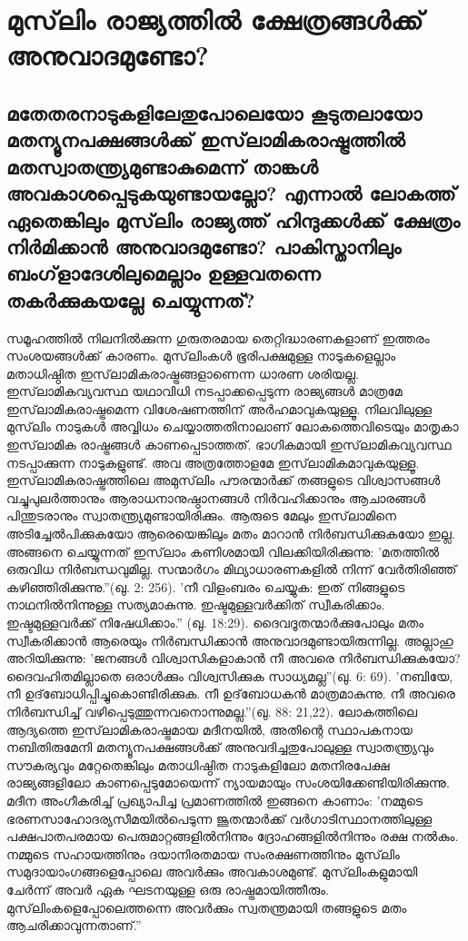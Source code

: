 \chapter{മുസ്‌ലിം രാജ്യത്തില്‍ ക്ഷേത്രങ്ങള്‍ക്ക് അനുവാദമുണ്ടോ? }
\section{ മതേതരനാടുകളിലേതുപോലെയോ കൂടുതലായോ മതന്യൂനപക്ഷങ്ങള്‍ക്ക് ഇസ്‌ലാമികരാഷ്ട്രത്തില്‍ മതസ്വാതന്ത്യ്രമുണ്ടാകുമെന്ന് താങ്കള്‍ അവകാശപ്പെടുകയുണ്ടായല്ലോ? എന്നാല്‍ ലോകത്ത് ഏതെങ്കിലും മുസ്‌ലിം രാജ്യത്ത് ഹിന്ദുക്കള്‍ക്ക് ക്ഷേത്രം നിര്‍മിക്കാന്‍ അനുവാദമുണ്ടോ? പാകിസ്താനിലും ബംഗ്‌ളാദേശിലുമെല്ലാം ഉള്ളവതന്നെ തകര്‍ക്കുകയല്ലേ ചെയ്യുന്നത്?}

 സമൂഹത്തില്‍ നിലനില്‍ക്കുന്ന ഗുരുതരമായ തെറ്റിദ്ധാരണകളാണ് ഇത്തരം സംശയങ്ങള്‍ക്ക് കാരണം. മുസ്‌ലിംകള്‍ ഭൂരിപക്ഷമുള്ള നാടുകളെല്ലാം മതാധിഷ്ഠിത ഇസ്‌ലാമികരാഷ്ട്രങ്ങളാണെന്ന ധാരണ ശരിയല്ല. ഇസ്‌ലാമികവ്യവസ്ഥ യഥാവിധി നടപ്പാക്കപ്പെടുന്ന രാജ്യങ്ങള്‍ മാത്രമേ ഇസ്‌ലാമികരാഷ്ട്രമെന്ന വിശേഷണത്തിന് അര്‍ഹമാവുകയുള്ളൂ. നിലവിലുള്ള മുസ്‌ലിം നാടുകള്‍ അവ്വിധം ചെയ്യാത്തതിനാലാണ് ലോകത്തെവിടെയും മാതൃകാ ഇസ്‌ലാമിക രാഷ്ട്രങ്ങള്‍ കാണപ്പെടാത്തത്. ഭാഗികമായി ഇസ്‌ലാമികവ്യവസ്ഥ നടപ്പാക്കുന്ന നാടുകളുണ്ട്. അവ അത്രത്തോളമേ ഇസ്‌ലാമികമാവുകയുള്ളൂ.
ഇസ്‌ലാമികരാഷ്ട്രത്തിലെ അമുസ്‌ലിം പൗരന്മാര്‍ക്ക് തങ്ങളുടെ വിശ്വാസങ്ങള്‍ വച്ചുപുലര്‍ത്താനും ആരാധനാനുഷ്ഠാനങ്ങള്‍ നിര്‍വഹിക്കാനും ആചാരങ്ങള്‍ പിന്തുടരാനും സ്വാതന്ത്യ്രമുണ്ടായിരിക്കും. ആരുടെ മേലും ഇസ്‌ലാമിനെ അടിച്ചേല്‍പിക്കുകയോ ആരെയെങ്കിലും മതം മാറാന്‍ നിര്‍ബന്ധിക്കുകയോ ഇല്ല. അങ്ങനെ ചെയ്യുന്നത് ഇസ്‌ലാം കണിശമായി വിലക്കിയിരിക്കുന്നു: 'മതത്തില്‍ ഒരുവിധ നിര്‍ബന്ധവുമില്ല. സന്മാര്‍ഗം മിഥ്യാധാരണകളില്‍ നിന്ന് വേര്‍തിരിഞ്ഞ് കഴിഞ്ഞിരിക്കുന്നു.''(ഖു. 2: 256).
'നീ വിളംബരം ചെയ്യുക: ഇത് നിങ്ങളുടെ നാഥനില്‍നിന്നുള്ള സത്യമാകുന്നു. ഇഷ്ടമുള്ളവര്‍ക്കിത് സ്വീകരിക്കാം. ഇഷ്ടമുള്ളവര്‍ക്ക് നിഷേധിക്കാം.'' (ഖു. 18:29).
ദൈവദൂതന്മാര്‍ക്കുപോലും മതം സ്വീകരിക്കാന്‍ ആരെയും നിര്‍ബന്ധിക്കാന്‍ അനുവാദമുണ്ടായിരുന്നില്ല. അല്ലാഹു അറിയിക്കുന്നു: 'ജനങ്ങള്‍ വിശ്വാസികളാകാന്‍ നീ അവരെ നിര്‍ബന്ധിക്കുകയോ? ദൈവഹിതമില്ലാതെ ഒരാള്‍ക്കും വിശ്വസിക്കുക സാധ്യമല്ല''(ഖു. 6: 69).
'നബിയേ, നീ ഉദ്‌ബോധിപ്പിച്ചുകൊണ്ടിരിക്കുക. നീ ഉദ്‌ബോധകന്‍ മാത്രമാകുന്നു. നീ അവരെ നിര്‍ബന്ധിച്ച് വഴിപ്പെടുത്തുന്നവനൊന്നുമല്ല.''(ഖു. 88: 21,22).
ലോകത്തിലെ ആദ്യത്തെ ഇസ്‌ലാമികരാഷ്ട്രമായ മദീനയില്‍, അതിന്റെ സ്ഥാപകനായ നബിതിരുമേനി മതന്യൂനപക്ഷങ്ങള്‍ക്ക് അനുവദിച്ചതുപോലുള്ള സ്വാതന്ത്യ്രവും സൗകര്യവും മറ്റേതെങ്കിലും മതാധിഷ്ഠിത നാടുകളിലോ മതനിരപേക്ഷ രാജ്യങ്ങളിലോ കാണപ്പെടുമോയെന്ന് ന്യായമായും സംശയിക്കേണ്ടിയിരിക്കുന്നു. മദീന അംഗീകരിച്ച് പ്രഖ്യാപിച്ച പ്രമാണത്തില്‍ ഇങ്ങനെ കാണാം: 'നമ്മുടെ ഭരണസാഹോദര്യസീമയില്‍പെടുന്ന ജൂതന്മാര്‍ക്ക് വര്‍ഗാടിസ്ഥാനത്തിലുള്ള പക്ഷപാതപരമായ പെരുമാറ്റങ്ങളില്‍നിന്നും ദ്രോഹങ്ങളില്‍നിന്നും രക്ഷ നല്‍കും. നമ്മുടെ സഹായത്തിനും ദയാനിരതമായ സംരക്ഷണത്തിനും മുസ്‌ലിം സമുദായാംഗങ്ങളെപ്പോലെ അവര്‍ക്കും അവകാശമുണ്ട്. മുസ്‌ലിംകളുമായി ചേര്‍ന്ന് അവര്‍ ഏക ഘടനയുള്ള ഒരു രാഷ്ട്രമായിത്തീരും. മുസ്‌ലിംകളെപ്പോലെത്തന്നെ അവര്‍ക്കും സ്വതന്ത്രമായി തങ്ങളുടെ മതം ആചരിക്കാവുന്നതാണ്.''
